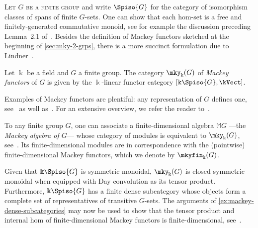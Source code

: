 \textsc{Let \(G\) be a finite group} and write \(\Spiso{G}\) for the category of isomorphism classes of spans of finite \(G\)\hyp{}sets.%
One can show that each hom-set is a free and finitely\hyp{}generated commutative monoid,
see for example the discussion preceding Lemma~2.1 of~\cite{thevenaz95:mackey}.
Besides the definition of Mackey functors sketched at the beginning of \cref{sec:mky-2-grps},
there is a more succinct formulation due to Lindner~\cite{lindner76:mackey}.

\begin{definition}\label{def:Mackey-functors}
  Let \(\Bbbk\) be a field and \(G\) a finite group.
  The category \(\mky_{\Bbbk}(G)\) of \emph{Mackey functors} of \(G\)
  is given by the \(\Bbbk\)\hyp{}linear functor category \([\Bbbk\Spiso{G},\kVect]\).
\end{definition}

Examples of Mackey functors are plentiful:
any representation of \(G\) defines one, see~\cite[Example~53.1]{thevenaz1995:G-algebrasModularRepresentation} as well as~\cite[Proposition~10.1]{panchadcharam07:mackey}.
For an extensive overview, we refer the reader to~\cite[Chapter~53]{thevenaz1995:G-algebrasModularRepresentation}.

\begin{example}\label{ex:mackey-algebra}
  To any finite group \(G\),
  one can associate a finite\hyp{}dimensional algebra \(\mathbb{M}G\)%
  —the \emph{Mackey algebra of \(G\)}—%
  whose category of modules is equivalent to \(\mky_{\Bbbk}(G)\), see~\cite[Propositions~3.1~and~3.2]{thevenaz95:mackey}.
  Its finite\hyp{}dimensional modules are in correspondence with the (pointwise) finite\hyp{}dimensional Mackey functors, which we denote by \(\mkyfin_{\Bbbk}(G)\).
\end{example}

Given that \(\Bbbk\Spiso{G}\) is symmetric monoidal, \(\mky_{\Bbbk}(G)\) is closed symmetric monoidal when equipped with Day convolution as its tensor product.
Furthermore, \(\Bbbk\Spiso{G}\) has a finite dense subcategory   whose objects form a complete set of representatives of transitive \(G\)\hyp{}sets.
The arguments of \cref{ex:mackey-dense-subcategories} may now be used to show that
the tensor product and internal hom of finite\hyp{}dimensional Mackey functors is finite\hyp{}dimensional,
see~\cite[Section~9]{panchadcharam07:mackey}.

